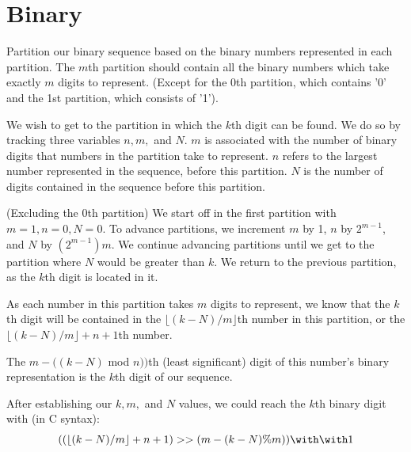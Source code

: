 \documentclass{article}
\begin{document}
\section{Binary}
Partition our binary sequence based on the binary numbers represented in each partition. The $m$th partition should contain all the binary numbers which take exactly $m$ digits to represent. (Except for the 0th partition, which contains '0' and the 1st partition, which consists of '1'). 
\par 
We wish to get to the partition in which the $k$th digit can be found. We do so by tracking three variables $n,m,$ and $N$. $m$ is associated with the number of binary digits that numbers in the partition take to represent. $n$ refers to the largest number represented in the sequence, before this partition. $N$ is the number of digits contained in the sequence before this partition.
\par 
(Excluding the 0th partition) We start off in the first partition with $m=1, n=0,N=0$. To advance partitions, we increment $m$ by 1, $n$ by $2^{m-1}$, and $N$ by $(2^{m-1})m$. We continue advancing partitions until we get to the partition where $N$ would be greater than $k$. We return to the previous partition, as the $k$th digit is located in it.
\par 
As each number in this partition takes $m$ digits to represent, we know that the $k$th digit will be contained in the $\lfloor (k-N)/m \rfloor$th number in this partition, or the $\lfloor (k-N)/m \rfloor + n +1$th number.
\par 
The $m-((k-N)$ mod $n))$th (least significant) digit of this number's binary representation is the $k$th digit of our sequence.
\par 
After establishing our $k,m,$ and $N$ values, we could reach the $k$th binary digit with (in C syntax):
\[( (\lfloor (k-N)/m \rfloor + n +1) >> (m-(k-N)\%m) ) \with\with   1 \]
\end{document}
